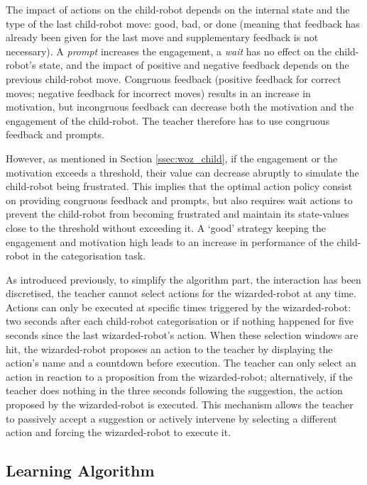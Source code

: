 The impact of actions on the child-robot depends on the internal state and the type of the last child-robot move: good, bad, or done (meaning that feedback has already been given for the last move and supplementary feedback is not necessary). A \textit{prompt} increases the engagement, a \textit{wait} has no effect on the child-robot's state, and the impact of positive and negative feedback depends on the previous child-robot move. Congruous feedback (positive feedback for correct moves; negative feedback for incorrect moves) results in an increase in motivation, but incongruous feedback can decrease both the motivation and the engagement of the child-robot. The teacher therefore has to use congruous feedback and prompts.

However, as mentioned in Section \ref{ssec:woz_child}, if the engagement or the motivation exceeds a threshold, their value can decrease abruptly to simulate the child-robot being frustrated. This implies that the optimal action policy consist on providing congruous feedback and prompts, but also requires wait actions to prevent the child-robot from becoming frustrated and maintain its state-values close to the threshold without exceeding it. A `good' strategy keeping the engagement and motivation high leads to an increase in performance of the child-robot in the categorisation task.

As introduced previously, to simplify the algorithm part, the interaction has been discretised, the teacher cannot select actions for the wizarded-robot at any time. Actions can only be executed at specific times triggered by the wizarded-robot: two seconds after each child-robot categorisation or if nothing happened for five seconds since the last wizarded-robot's action. When these selection windows are hit, the wizarded-robot proposes an action to the teacher by displaying the action's name and a countdown before execution. The teacher can only select an action in reaction to a proposition from the wizarded-robot; alternatively, if the teacher does nothing in the three seconds following the suggestion, the action proposed by the wizarded-robot is executed. This mechanism allows the teacher to passively accept a suggestion or actively intervene by selecting a different action and forcing the wizarded-robot to execute it.

\subsection{Learning Algorithm}

